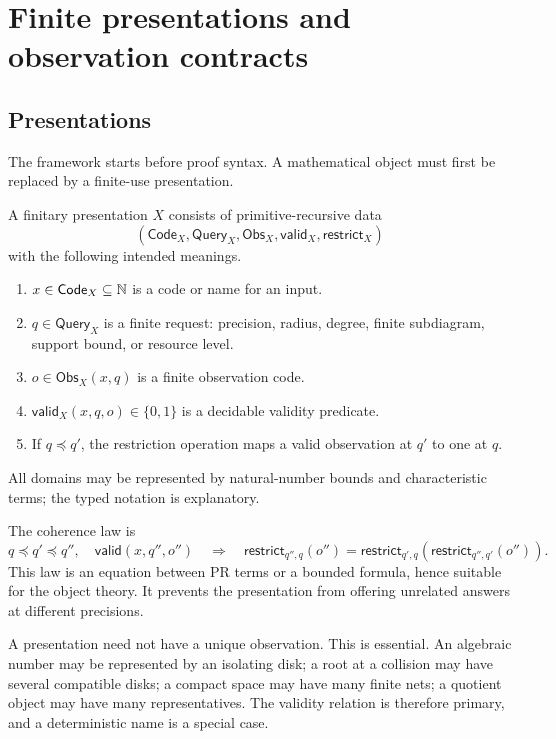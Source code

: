 \section{Finite presentations and observation contracts}

\subsection{Presentations}

The framework starts before proof syntax.  A mathematical object must first be
replaced by a finite-use presentation.

\begin{definition}
A finitary presentation \(X\) consists of primitive-recursive data
\[
 (\mathsf{Code}_X,\mathsf{Query}_X,\mathsf{Obs}_X,
   \mathsf{valid}_X,\mathsf{restrict}_X)
\]
with the following intended meanings.
\begin{enumerate}
\item \(x\in\mathsf{Code}_X\subseteq\mathbb N\) is a code or name for an input.
\item \(q\in\mathsf{Query}_X\) is a finite request: precision, radius, degree,
finite subdiagram, support bound, or resource level.
\item \(o\in\mathsf{Obs}_X(x,q)\) is a finite observation code.
\item \(\mathsf{valid}_X(x,q,o)\in\{0,1\}\) is a decidable validity predicate.
\item If \(q\preceq q'\), the restriction operation maps a valid observation at
\(q'\) to one at \(q\).
\end{enumerate}
All domains may be represented by natural-number bounds and characteristic
terms; the typed notation is explanatory.
\end{definition}

The coherence law is
\[
  q\preceq q'\preceq q'',\quad
  \mathsf{valid}(x,q'',o'')
  \quad\Longrightarrow\quad
  \mathsf{restrict}_{q'',q}(o'')
  =\mathsf{restrict}_{q',q}
      (\mathsf{restrict}_{q'',q'}(o'')).
\]
This law is an equation between PR terms or a bounded formula, hence suitable
for the object theory.  It prevents the presentation from offering unrelated
answers at different precisions.

A presentation need not have a unique observation.  This is essential.  An
algebraic number may be represented by an isolating disk; a root at a collision
may have several compatible disks; a compact space may have many finite nets;
a quotient object may have many representatives.  The validity relation is
therefore primary, and a deterministic name is a special case.


